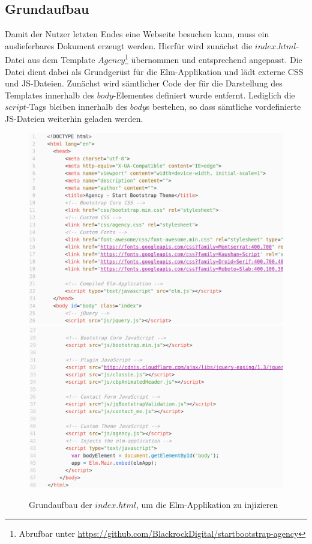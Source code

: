 \subsection{Grundaufbau}
\label{sec:Grundaufbau}
Damit der Nutzer letzten Endes eine Webseite besuchen kann, muss ein auslieferbares Dokument erzeugt werden. Hierfür wird zunächst die $index.html$-Datei aus dem Template $Agency$\footnote{Abrufbar unter \url{https://github.com/BlackrockDigital/startbootstrap-agency}} übernommen und entsprechend angepasst. Die Datei dient dabei als Grundgerüst für die Elm-Applikation und lädt externe \ac{CSS} und \ac{JS}-Dateien.
Zunächst wird sämtlicher Code der für die Darstellung des Templates innerhalb des $body$-Elementes definiert wurde entfernt. Lediglich die $script$-Tags bleiben innerhalb des $body$s bestehen, so dass sämtliche vordefinierte \ac{JS}-Dateien weiterhin geladen werden.
\begin{figure}[p]
\centering
\includegraphics[scale=0.32]{img/index-grundaufbau-1.png}
\includegraphics[scale=0.32]{img/index-grundaufbau-2.png}
\caption{Grundaufbau der $index.html$, um die Elm-Applikation zu injizieren}\label{fig:index-grundaufbau}
\end{figure}

